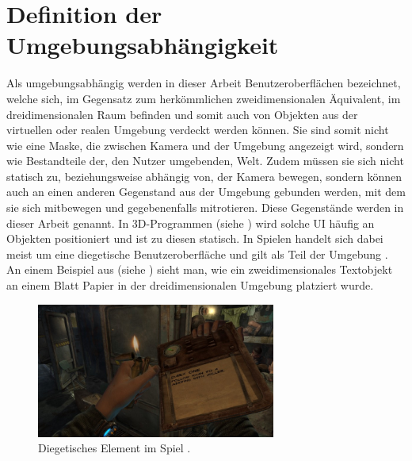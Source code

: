 	\section{Definition der Umgebungsabhängigkeit}
		Als umgebungsabhängig werden in dieser Arbeit Benutzeroberflächen bezeichnet, welche sich, im Gegensatz zum herkömmlichen zweidimensionalen Äquivalent, im dreidimensionalen Raum befinden und somit auch von Objekten aus der virtuellen oder realen Umgebung verdeckt werden können. Sie sind somit nicht wie eine Maske, die zwischen Kamera und der Umgebung angezeigt wird, sondern wie Bestandteile der, den Nutzer umgebenden, Welt. Zudem müssen sie sich nicht statisch zu, beziehungsweise abhängig von, der Kamera bewegen, sondern können auch an einen anderen Gegenstand aus der Umgebung gebunden werden, mit dem sie sich mitbewegen und gegebenenfalls mitrotieren. Diese Gegenstände werden in dieser Arbeit  genannt.
		In 3D-Programmen (siehe ) wird solche UI häufig an Objekten positioniert und ist zu diesen statisch. In Spielen handelt sich dabei meist um eine diegetische Benutzeroberfläche und gilt als Teil der Umgebung \cite{diegetic}. An einem Beispiel aus  (siehe ) sieht man, wie ein zweidimensionales Textobjekt an einem Blatt Papier in der dreidimensionalen Umgebung platziert wurde.
		
		\begin{figure}[htbp]
			\centering
			\includegraphics[width=0.7\textwidth]{figures/diegeticUI.jpeg}
			\caption{Diegetisches Element im Spiel  .}
			\label{fig:diegetic}
		\end{figure}
	